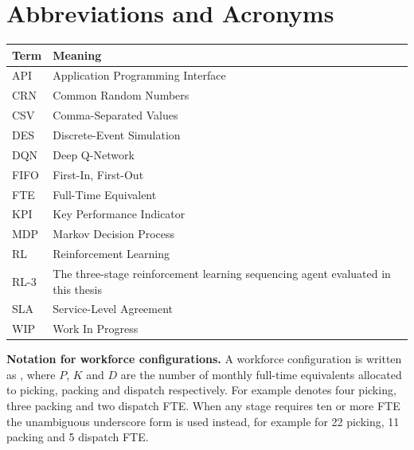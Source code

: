 \chapter*{Abbreviations and Acronyms}

\begin{tabularx}{\textwidth}{lX}
\toprule
\textbf{Term} & \textbf{Meaning} \\
\midrule
API   & Application Programming Interface \\
CRN   & Common Random Numbers \\
CSV   & Comma-Separated Values \\
DES   & Discrete-Event Simulation \\
DQN   & Deep Q-Network \\
FIFO  & First-In, First-Out \\
FTE   & Full-Time Equivalent \\
KPI   & Key Performance Indicator \\
MDP   & Markov Decision Process \\
RL    & Reinforcement Learning \\
RL-3  & The three-stage reinforcement learning sequencing agent evaluated in this thesis \\
SLA   & Service-Level Agreement \\
WIP   & Work In Progress \\
\bottomrule
\end{tabularx}

\vspace{1.0cm}
\noindent\textbf{Notation for workforce configurations.}
A workforce configuration is written as , where \(P\), \(K\) and \(D\) are the number
of monthly full-time equivalents allocated to picking, packing and dispatch respectively. For
example  denotes four picking, three packing and two dispatch FTE. When any stage
requires ten or more FTE the unambiguous underscore form is used instead, for example
 for 22 picking, 11 packing and 5 dispatch FTE.
